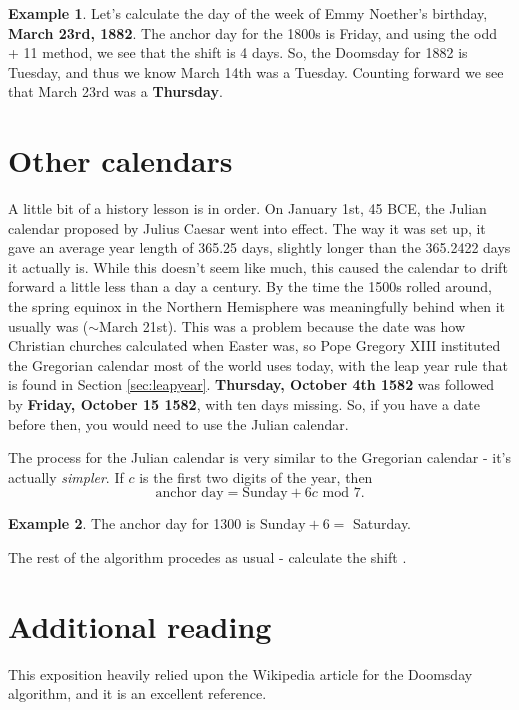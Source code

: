 \documentclass[12pt,letterpaper]{article}
\theoremstyle{plain}
\theoremstyle{definition}
\newtheorem{example}{Example}
\begin{document}
\begin{example}
	Let's calculate the day of the week of Emmy Noether's birthday, \textbf{March 23rd, 1882}. The anchor day for the 1800s is Friday, and using the odd + 11 method, we see that the shift is 4 days. So, the Doomsday for 1882 is Tuesday, and thus we know March 14th was a Tuesday. Counting forward we see that March 23rd was a \textbf{Thursday}.
\end{example}

\section{Other calendars}\label{sec:non-gregorian}

A little bit of a history lesson is in order. On January 1st, 45 BCE, the Julian calendar proposed by Julius Caesar went into effect. The way it was set up, it gave an average year length of 365.25 days, slightly longer than the 365.2422 days it actually is. While this doesn't seem like much, this caused the calendar to drift forward a little less than a day a century. By the time the 1500s rolled around, the spring equinox in the Northern Hemisphere was meaningfully behind when it usually was (\(\sim\)March 21st). This was a problem because the date was how Christian churches calculated when Easter was, so Pope Gregory XIII instituted the Gregorian calendar most of the world uses today, with the leap year rule that is found in Section \ref{sec:leapyear}. \textbf{Thursday, October 4th 1582} was followed by \textbf{Friday, October 15 1582}, with ten days missing. So, if you have a date before then, you would need to use the Julian calendar. 

The process for the Julian calendar is very similar to the Gregorian calendar - it's actually \textit{simpler}. If \(c\) is the first two digits of the year, then 
\[\text{anchor day}=\text{Sunday}+6c\text{ mod } 7.\]
\begin{example}
	The anchor day for 1300 is \(\text{Sunday}+ 6=\) Saturday. 
\end{example}
The rest of the algorithm procedes as usual - calculate the shift . 

\section{Additional reading}
This exposition heavily relied upon the Wikipedia article for the Doomsday algorithm, and it is an excellent reference. 
\end{document}
